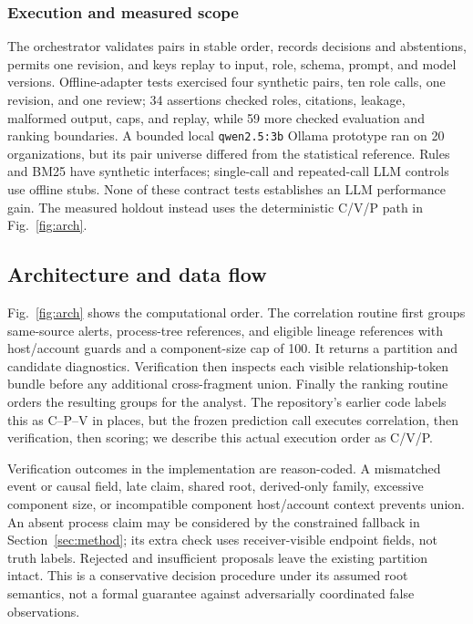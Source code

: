 \documentclass[pdflatex,sn-mathphys-num,iicol]{sn-jnl}
\begin{document}
\subsubsection{Execution and measured scope}
The orchestrator validates pairs in stable order, records decisions and abstentions, permits one revision, and keys replay to input, role, schema, prompt, and model versions. Offline-adapter tests exercised four synthetic pairs, ten role calls, one revision, and one review; 34 assertions checked roles, citations, leakage, malformed output, caps, and replay, while 59 more checked evaluation and ranking boundaries. A bounded local \texttt{qwen2.5:3b} Ollama prototype ran on 20 organizations, but its pair universe differed from the statistical reference. Rules and BM25 have synthetic interfaces; single-call and repeated-call LLM controls use offline stubs. None of these contract tests establishes an LLM performance gain. The measured holdout instead uses the deterministic C/V/P path in Fig.~\ref{fig:arch}.


\subsection{Architecture and data flow}
Fig.~\ref{fig:arch} shows the computational order. The correlation routine first groups same-source alerts, process-tree references, and eligible lineage references with host/account guards and a component-size cap of 100. It returns a partition and candidate diagnostics. Verification then inspects each visible relationship-token bundle before any additional cross-fragment union. Finally the ranking routine orders the resulting groups for the analyst. The repository's earlier code labels this as C--P--V in places, but the frozen prediction call executes correlation, then verification, then scoring; we describe this actual execution order as C/V/P.

Verification outcomes in the implementation are reason-coded. A mismatched event or causal field, late claim, shared root, derived-only family, excessive component size, or incompatible component host/account context prevents union. An absent process claim may be considered by the constrained fallback in Section~\ref{sec:method}; its extra check uses receiver-visible endpoint fields, not truth labels. Rejected and insufficient proposals leave the existing partition intact. This is a conservative decision procedure under its assumed root semantics, not a formal guarantee against adversarially coordinated false observations.
\end{document}
